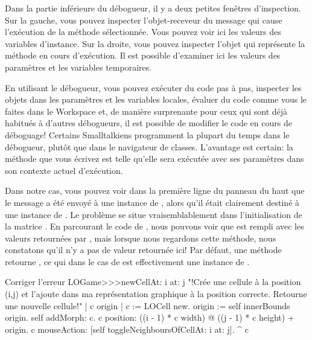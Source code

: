 \documentclass[a4paper,10pt,twoside]{book}
\begin{document}
Dans la partie inférieure du débogueur, il y a deux petites fen\^etres
d'inspection. Sur la gauche, vous pouvez inspecter l'objet-receveur du message qui cause l'exécution de la méthode sélectionnée. Vous pouvez voir ici les valeurs des variables d'instance.
Sur la droite, vous pouvez inspecter l'objet qui représente la méthode en cours d'exécution. Il est possible d'examiner ici les valeurs des paramètres et les variables temporaires.

En utilisant le débogueur, vous pouvez exécuter du code pas à pas,
inspecter les objets dans les paramètres et les variables locales,
évaluer du code comme vous le faites dans le Workspace et, de manière
surprenante pour ceux qui sont déjà habitués à d'autres débogueurs, il
est possible de modifier le code en cours de déboguage! 
Certains Smalltalkiens programment la plupart du temps dans le
débogueur, plutôt que dans le navigateur de classes.
L'avantage est certain: la méthode que vous écrivez est telle
qu'elle sera exécutée \ie avec ses paramètres dans son contexte
actuel d'exécution.

Dans notre cas, vous pouvez voir dans la première ligne du panneau du haut que le message  a été envoyé à une instance de , alors qu'il était clairement destiné à une instance de .
Le problème se situe vraisemblablement dans l'initialisation de la matrice .
En parcourant le code de , nous pouvons
voir que  est rempli avec les valeurs retournées par
, mais lorsque nous regardons cette méthode, nous
constatons qu'il n'y a pas de valeur retournée ici!
Par défaut, une méthode retourne , ce qui dans le cas de  est effectivement une instance de .


\begin{method}{Corriger l'erreur}
LOGame>>>newCellAt: i at: j
    "!Crée une cellule à la position (i,j) et l'ajoute dans ma représentation graphique à la position correcte. Retourne une nouvelle cellule!"
   | c origin |
   c := LOCell new.
   origin := self innerBounds origin.
   self addMorph: c.
   c position: ((i - 1) * c width) @ ((j - 1) * c height) + origin.
   c mouseAction: [self toggleNeighboursOfCellAt: i at: j].
   ^ c
\end{method}
\end{document}

